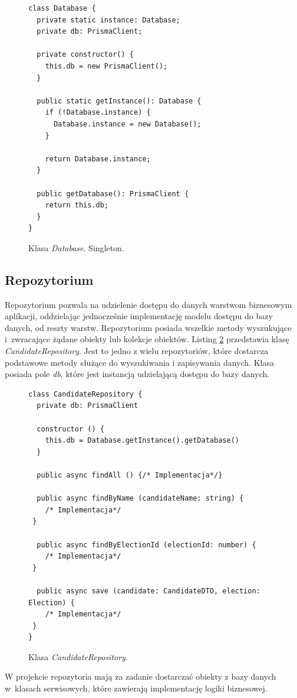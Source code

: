 \documentclass[a4paper,12pt]{book}
\begin{document}
\begin{figure} [H]
  \centering
\begin{lstlisting}[style=ES6]
class Database {
  private static instance: Database;
  private db: PrismaClient;

  private constructor() {
    this.db = new PrismaClient();
  }

  public static getInstance(): Database {
    if (!Database.instance) {
      Database.instance = new Database();
    }

    return Database.instance;
  }

  public getDatabase(): PrismaClient {
    return this.db;
  }
}
\end{lstlisting}
\caption{Klasa \textit{Database}. Singleton.}
\label{singleton}
\end{figure}

\subsection{Repozytorium}

Repozytorium pozwala na udzielenie dostępu do danych warstwom biznesowym aplikacji, oddzielając jednocześnie implementację modelu dostępu do bazy danych, od reszty warstw. Repozytorium posiada wszelkie metody wyszukujące i~zwracające żądane obiekty lub kolekcje obiektów. Listing \ref{repo} przedstawia klasę \textit{CandidateRepository}. Jest to jedno z wielu repozytoriów, które dostarcza podstawowe metody służące do wyszukiwania i zapisywania danych. Klasa posiada pole \textit{db}, które jest instancją udzielającą dostępu do bazy danych.

\begin{figure}[H]
  \centering
\begin{lstlisting}[style=ES6]
class CandidateRepository {
  private db: PrismaClient

  constructor () {
    this.db = Database.getInstance().getDatabase()
  }

  public async findAll () {/* Implementacja*/}

  public async findByName (candidateName: string) {
	/* Implementacja*/
 }

  public async findByElectionId (electionId: number) {
	/* Implementacja*/
 }

  public async save (candidate: CandidateDTO, election: Election) {
	/* Implementacja*/
 }
}
\end{lstlisting}
\caption{Klasa \textit{CandidateRepository}.}
\label{repo}
\end{figure}
W projekcie repozytoria mają za zadanie dostarczać obiekty z bazy danych w~klasach serwisowych, które zawierają implementację logiki biznesowej.
\end{document}
